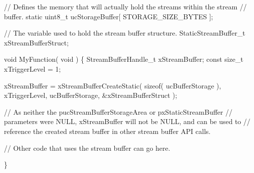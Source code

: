 \begin{DoxyPre}// Defines the memory that will actually hold the streams within the stream
// buffer.
static uint8\_t ucStorageBuffer[ STORAGE\_SIZE\_BYTES ];\end{DoxyPre}



\begin{DoxyPre}// The variable used to hold the stream buffer structure.
StaticStreamBuffer\_t xStreamBufferStruct;\end{DoxyPre}



\begin{DoxyPre}void MyFunction( void )
\{
StreamBufferHandle\_t xStreamBuffer;
const size\_t xTriggerLevel = 1;
\begin{DoxyVerb}xStreamBuffer = xStreamBufferCreateStatic( sizeof( ucBufferStorage ),
                                           xTriggerLevel,
                                           ucBufferStorage,
                                           &xStreamBufferStruct );

// As neither the pucStreamBufferStorageArea or pxStaticStreamBuffer
// parameters were NULL, xStreamBuffer will not be NULL, and can be used to
// reference the created stream buffer in other stream buffer API calls.

// Other code that uses the stream buffer can go here.
\end{DoxyVerb}

\}\end{DoxyPre}



\begin{DoxyPre}\end{DoxyPre}
 